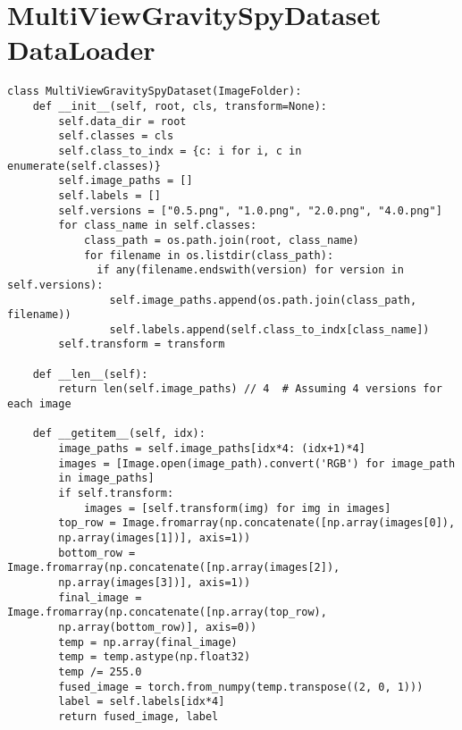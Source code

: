\chapter{MultiViewGravitySpyDataset DataLoader}
\label{appendix2}
\begin{verbatim}
class MultiViewGravitySpyDataset(ImageFolder):
    def __init__(self, root, cls, transform=None):
        self.data_dir = root
        self.classes = cls
        self.class_to_indx = {c: i for i, c in enumerate(self.classes)}
        self.image_paths = []
        self.labels = []
        self.versions = ["0.5.png", "1.0.png", "2.0.png", "4.0.png"]
        for class_name in self.classes:
            class_path = os.path.join(root, class_name)
            for filename in os.listdir(class_path):
              if any(filename.endswith(version) for version in self.versions):
                self.image_paths.append(os.path.join(class_path, filename))
                self.labels.append(self.class_to_indx[class_name])
        self.transform = transform

    def __len__(self):
        return len(self.image_paths) // 4  # Assuming 4 versions for each image

    def __getitem__(self, idx):
        image_paths = self.image_paths[idx*4: (idx+1)*4]  
        images = [Image.open(image_path).convert('RGB') for image_path 
        in image_paths]
        if self.transform:
            images = [self.transform(img) for img in images]
        top_row = Image.fromarray(np.concatenate([np.array(images[0]), 
        np.array(images[1])], axis=1))
        bottom_row = Image.fromarray(np.concatenate([np.array(images[2]), 
        np.array(images[3])], axis=1))
        final_image = Image.fromarray(np.concatenate([np.array(top_row), 
        np.array(bottom_row)], axis=0))
        temp = np.array(final_image) 
        temp = temp.astype(np.float32)
        temp /= 255.0
        fused_image = torch.from_numpy(temp.transpose((2, 0, 1)))
        label = self.labels[idx*4] 
        return fused_image, label
\end{verbatim}